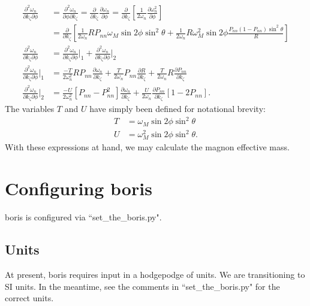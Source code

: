 \documentclass{article}
\begin{document}
\begin{align}
\frac{\partial^2 \omega_{n}}{\partial k_{\zeta} \partial \phi} &= \frac{\partial^2 \omega_{n}}{\partial \phi \partial k_{\zeta}} = \frac{\partial}{\partial k_{\zeta}} \frac{\partial \omega_{n}}{\partial \phi} = \frac{\partial}{\partial k_{\zeta}} \left[\frac{1}{2 \omega_{n}} \frac{\partial \omega_{n}^2}{\partial \phi} \right] \\
&= \frac{\partial}{\partial k_{\zeta}} \left[\frac{1}{2 \omega_{n}} R P_{nn} \omega_{M} \sin{2\phi} \sin^2{\theta} + \frac{1}{2 \omega_{n}} R \omega_{M}^2 \sin{2 \phi} \frac{P_{nn} (1 - P_{nn}) \sin^2{\theta}}{R} \right] \\
\frac{\partial^2 \omega_{n}}{\partial k_{\zeta} \partial \phi} &= \frac{\partial^2 \omega_{n}}{\partial k_{\zeta} \partial \phi}\bigg|_{1} + \frac{\partial^2 \omega_{n}}{\partial k_{\zeta} \partial \phi}\bigg|_{2} \\
\frac{\partial^2 \omega_{n}}{\partial k_{\zeta} \partial \phi}\bigg|_{1} &= \frac{-T}{2 \omega_{n}^2} R P_{nn} \frac{\partial \omega_{n}}{\partial k_{\zeta}} + \frac{T}{2 \omega_{n}} P_{nn} \frac{\partial R}{\partial k_{\zeta}} + \frac{T}{2 \omega_{n}} R \frac{\partial P_{nn}}{\partial k_{\zeta}} \\
\frac{\partial^2 \omega_{n}}{\partial k_{\zeta} \partial \phi}\bigg|_{2} &= \frac{- U}{2\omega_{n}^2} \left[P_{nn} - P_{nn}^2 \right] \frac{\partial \omega_{n}}{\partial k_{\zeta}} + \frac{U}{2 \omega_{n}} \frac{\partial P_{nn}}{\partial k_{\zeta}} \left[1 - 2 P_{nn} \right].
\end{align}
The variables $T$ and $U$ have simply been defined for notational brevity:
\begin{align}
T &= \omega_{M} \sin{2 \phi} \sin^2{\theta} \\
U &= \omega_{M}^2 \sin{2 \phi} \sin^2{\theta}.
\end{align}
With these expressions at hand, we may calculate the magnon effective mass.

\section{Configuring boris}
boris is configured via ``set\_{}the\_{}boris.py".
\subsection{Units}
At present, boris requires input in a hodgepodge of units. We are transitioning to SI units. In the meantime, see the comments in ``set\_{}the\_{}boris.py" for the correct units.
\end{document}
